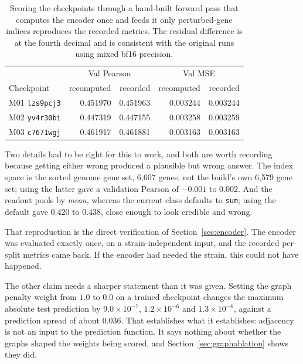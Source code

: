 \begin{table}[htbp]
\centering
\begin{tabular}{lrrrr}
\hline
& \multicolumn{2}{c}{Val Pearson} & \multicolumn{2}{c}{Val MSE} \\
Checkpoint & recomputed & recorded & recomputed & recorded \\
\hline
M01 \texttt{lzs9pcj3} & 0.451970 & 0.451963 & 0.003244 & 0.003244 \\
M02 \texttt{yv4r30bi} & 0.447319 & 0.447155 & 0.003258 & 0.003259 \\
M03 \texttt{c7671wgj} & 0.461917 & 0.461881 & 0.003163 & 0.003163 \\
\hline
\end{tabular}
\caption{Scoring the checkpoints through a hand-built forward pass that computes
the encoder once and feeds it only perturbed-gene indices reproduces the
recorded metrics. The residual difference is at the fourth decimal and is
consistent with the original runs using mixed bf16 precision.}
\label{tab:repro}
\end{table}

Two details had to be right for this to work, and both are worth recording
because getting either wrong produced a plausible but wrong answer. The index
space is the sorted genome gene set, 6{,}607 genes, not the build's own 6{,}579
gene set; using the latter gave a validation Pearson of $-0.001$ to $0.002$. And
the readout pools by \emph{mean}, whereas the current class defaults to
\texttt{sum}; using the default gave 0.420 to 0.438, close enough to look
credible and wrong.

That reproduction is the direct verification of Section~\ref{sec:encoder}. The
encoder was evaluated exactly once, on a strain-independent input, and the
recorded per-split metrics came back. If the encoder had needed the strain, this
could not have happened.

The other claim needs a sharper statement than it was given. Setting the graph
penalty weight from $1.0$ to $0.0$ on a trained checkpoint changes the maximum
absolute test prediction by $9.0 \times 10^{-7}$, $1.2 \times 10^{-6}$ and
$1.3 \times 10^{-6}$, against a prediction spread of about $0.036$. That
establishes what it establishes: adjacency is not an input to the prediction
function. It says nothing about whether the graphs shaped the weights being
scored, and Section~\ref{sec:graphablation} shows they did.

